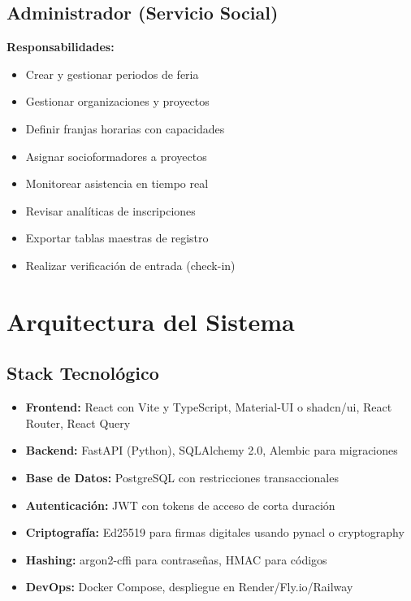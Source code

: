 \documentclass[12pt,a4paper]{article}
\begin{document}
\subsection{Administrador (Servicio Social)}

\textbf{Responsabilidades:}
\begin{itemize}[leftmargin=*]
    \item Crear y gestionar periodos de feria
    \item Gestionar organizaciones y proyectos
    \item Definir franjas horarias con capacidades
    \item Asignar socioformadores a proyectos
    \item Monitorear asistencia en tiempo real
    \item Revisar analíticas de inscripciones
    \item Exportar tablas maestras de registro
    \item Realizar verificación de entrada (check-in)
\end{itemize}

\section{Arquitectura del Sistema}

\subsection{Stack Tecnológico}

\begin{itemize}[leftmargin=*]
    \item \textbf{Frontend:} React con Vite y TypeScript, Material-UI o shadcn/ui, React Router, React Query
    \item \textbf{Backend:} FastAPI (Python), SQLAlchemy 2.0, Alembic para migraciones
    \item \textbf{Base de Datos:} PostgreSQL con restricciones transaccionales
    \item \textbf{Autenticación:} JWT con tokens de acceso de corta duración
    \item \textbf{Criptografía:} Ed25519 para firmas digitales usando pynacl o cryptography
    \item \textbf{Hashing:} argon2-cffi para contraseñas, HMAC para códigos
    \item \textbf{DevOps:} Docker Compose, despliegue en Render/Fly.io/Railway
\end{itemize}
\end{document}

